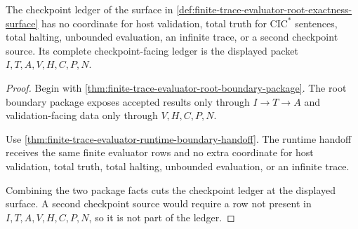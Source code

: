 \begin{theorem}
\label{thm:finite-trace-evaluator-checkpoint-ledger-cut}
The checkpoint ledger of the surface in
\autoref{def:finite-trace-evaluator-root-exactness-surface} has no coordinate
for host validation, total truth for $\mathrm{CIC}^{*}$ sentences, total
halting, unbounded evaluation, an infinite trace, or a second checkpoint
source. Its complete checkpoint-facing ledger is the displayed packet
$I,T,A,V,H,C,P,N$.
\end{theorem}
\begin{proof}
Begin with \autoref{thm:finite-trace-evaluator-root-boundary-package}. The root
boundary package exposes accepted results only through $I \to T \to A$ and
validation-facing data only through $V,H,C,P,N$.

Use \autoref{thm:finite-trace-evaluator-runtime-boundary-handoff}. The runtime
handoff receives the same finite evaluator rows and no extra coordinate for
host validation, total truth, total halting, unbounded evaluation, or an
infinite trace.

Combining the two package facts cuts the checkpoint ledger at the displayed
surface. A second checkpoint source would require a row not present in
$I,T,A,V,H,C,P,N$, so it is not part of the ledger.
\end{proof}
